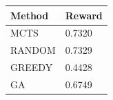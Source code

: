\begin{tabular}{ll}
\hline
Method & Reward \\
\hline
  MCTS & 0.7320 \\
  RANDOM & 0.7329 \\
  GREEDY & 0.4428 \\
  GA & 0.6749 \\
\hline
\end{tabular}
